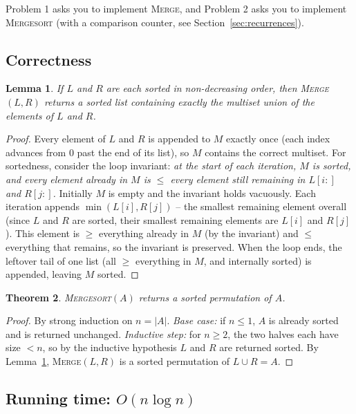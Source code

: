 \documentclass[11pt]{article}
\newtheorem{theorem}{Theorem}[section]
\newtheorem{lemma}[theorem]{Lemma}
\begin{document}
Problem 1 asks you to implement \textsc{Merge}, and Problem 2 asks you to implement
\textsc{Mergesort} (with a comparison counter, see Section~\ref{sec:recurrences}).

\subsection{Correctness}

\begin{lemma}
\label{lem:merge-correct}
If $L$ and $R$ are each sorted in non-decreasing order, then \textsc{Merge}$(L, R)$ returns
a sorted list containing exactly the multiset union of the elements of $L$ and $R$.
\end{lemma}

\begin{proof}
Every element of $L$ and $R$ is appended to $M$ exactly once (each index advances from $0$
past the end of its list), so $M$ contains the correct multiset. For sortedness, consider
the loop invariant: \emph{at the start of each iteration, $M$ is sorted, and every element
already in $M$ is $\le$ every element still remaining in $L[i\mathbin{:}]$ and
$R[j\mathbin{:}]$.} Initially $M$ is empty and the invariant holds vacuously. Each
iteration appends $\min(L[i], R[j])$ -- the smallest remaining element overall (since $L$
and $R$ are sorted, their smallest remaining elements are $L[i]$ and $R[j]$). This element
is $\ge$ everything already in $M$ (by the invariant) and $\le$ everything that remains, so
the invariant is preserved. When the loop ends, the leftover tail of one list (all $\ge$
everything in $M$, and internally sorted) is appended, leaving $M$ sorted.
\end{proof}

\begin{theorem}
\textsc{Mergesort}$(A)$ returns a sorted permutation of $A$.
\end{theorem}

\begin{proof}
By strong induction on $n = |A|$. \emph{Base case:} if $n \le 1$, $A$ is already sorted and
is returned unchanged. \emph{Inductive step:} for $n \ge 2$, the two halves each have size
$< n$, so by the inductive hypothesis $L$ and $R$ are returned sorted. By
Lemma~\ref{lem:merge-correct}, \textsc{Merge}$(L, R)$ is a sorted permutation of $L \cup R
= A$.
\end{proof}

\subsection{Running time: \texorpdfstring{$O(n \log n)$}{O(n log n)}}
\end{document}

